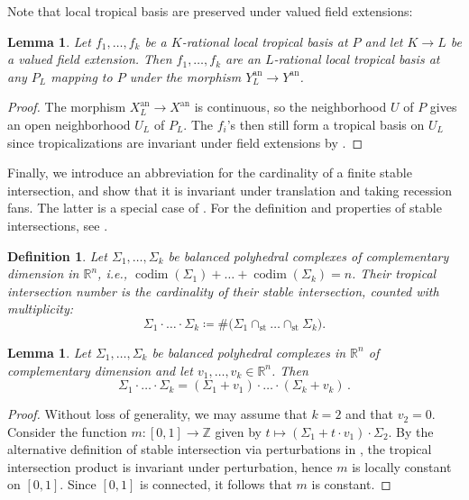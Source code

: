 \documentclass[12pt,reqno,a4paper]{amsart}
\theoremstyle{theoremstyle}
\newtheorem{lemma}[theorem]{Lemma}
\theoremstyle{examplestyle}
\newtheorem{definition}[theorem]{Definition}
\theoremstyle{algorithmstyle}
\newcommand{\RR}{\mathbb{R}}
\newcommand{\ZZ}{\mathbb{Z}}
\newcommand{\st}{{\mathrm{st}}}
\DeclareMathOperator{\codim}{codim}
\begin{document}
Note that local tropical basis are preserved under valued field extensions:

\begin{lemma}
  \label{lem:tropicalBasisFieldExtension}
  Let $f_{1},\dots,f_k$ be a $K$-rational local tropical basis at $P$ and let $K\to{L}$ be a valued field extension. Then $f_{1},\dots,f_k$ are an $L$-rational local tropical basis at any $P_{L}$ mapping to $P$ under the morphism $Y_{L}^{\mathrm{an}}\to{Y^{\mathrm{an}}}$.
\end{lemma}
\begin{proof}
  The morphism $X_{L}^{\mathrm{an}}\to{X^{\mathrm{an}}}$ is continuous, so the neighborhood $U$ of $P$ gives an open neighborhood $U_{L}$ of $P_{L}$. The $f_{i}$'s then still form a tropical basis on $U_{L}$ since tropicalizations are invariant under field extensions by \cite[Theorem 3.2.4]{MS15}.
\end{proof}

Finally, we introduce an abbreviation for the cardinality of a finite stable intersection, and show that it is invariant under translation and taking recession fans.   The latter is a special case of \cite[Theorem 5.7]{AHR16}. For the definition and properties of stable intersections, see \cite[Section 3.6]{MS15}.

\begin{definition}
  \label{def:tropicalIntersectionNumber}
  Let $\Sigma_1,\dots,\Sigma_k$ be balanced polyhedral complexes of complementary dimension in $\RR^n$, i.e., $\codim(\Sigma_1)+\dots+\codim(\Sigma_k)=n$.  Their \emph{tropical intersection number} is the cardinality of their stable intersection, counted with multiplicity:
  \begin{equation*}
    \Sigma_1\cdot\ldots\cdot\Sigma_k\coloneqq \#\Big(\Sigma_1\cap_{\st}\dots\cap_\st\Sigma_k\Big).
  \end{equation*}
\end{definition}

\begin{lemma}
  \label{lem:tropicalIntersectionProductTranslationInvariant}
  Let $\Sigma_1,\dots,\Sigma_k$ be balanced polyhedral complexes in $\RR^n$ of complementary dimension and let $v_1,\dots,v_k\in\RR^n$.  Then
  \[ \Sigma_1\cdot\ldots\cdot \Sigma_k = (\Sigma_1+v_1)\cdot \ldots\cdot(\Sigma_k+v_k) \, . \]
\end{lemma}
\begin{proof}
  Without loss of generality, we may assume that $k=2$ and that $v_2=0$. Consider the function $m\colon [0,1] \rightarrow \ZZ$ given by $t \mapsto (\Sigma_1+t\cdot v_1)\cdot \Sigma_2$.  %
  By the alternative definition of stable intersection via perturbations in \cite[Proposition~3.6.12]{MS15}, the tropical intersection product is invariant under perturbation, hence $m$ is locally constant on $[0,1]$.  Since $[0,1]$ is connected, it follows that $m$ is constant.
\end{proof}
\end{document}
